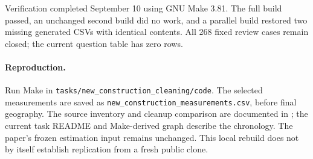 Verification completed September 10 using GNU Make 3.81. The full build passed,
an unchanged second build did no work, and a parallel build restored two missing
generated CSVs with identical contents. All 268 fixed review cases remain closed;
the current question table has zero rows.

\paragraph{Reproduction.}
Run Make in \texttt{tasks/new\_construction\_cleaning/code}. The selected
measurements are saved as \texttt{new\_construction\_measurements.csv}, before
final geography. The source inventory and cleanup comparison are documented in
; the
current task README and Make-derived graph describe the chronology. The paper's
frozen estimation input remains unchanged. This local rebuild does not by itself
establish replication from a fresh public clone.
